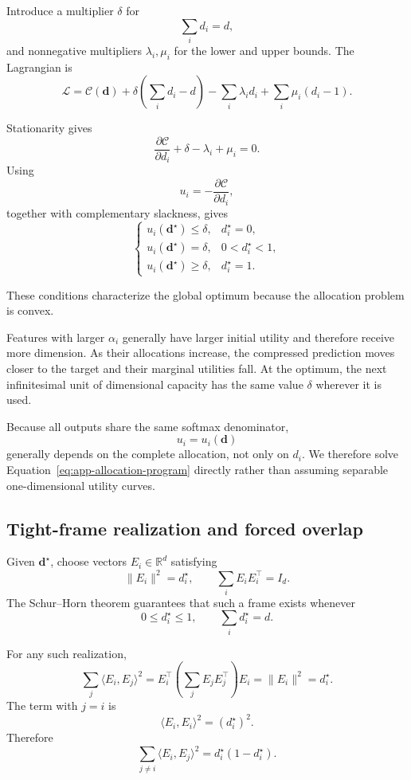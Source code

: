 Introduce a multiplier \(\delta\) for
\[
\sum_i d_i=d,
\]
and nonnegative multipliers \(\lambda_i,\mu_i\) for the lower and upper bounds. The
Lagrangian is
\[
\mathscr L
=
\mathcal C(\mathbf d)
+
\delta\left(\sum_i d_i-d\right)
-
\sum_i\lambda_i d_i
+
\sum_i\mu_i(d_i-1).
\]

Stationarity gives
\[
\frac{\partial\mathcal C}{\partial d_i}
+\delta-\lambda_i+\mu_i=0.
\]
Using
\[
u_i=-\frac{\partial\mathcal C}{\partial d_i},
\]
together with complementary slackness, gives
\begin{equation}
\boxed{
\begin{cases}
u_i(\mathbf d^\star)\le \delta,
&d_i^\star=0,
\\[1mm]
u_i(\mathbf d^\star)=\delta,
&0<d_i^\star<1,
\\[1mm]
u_i(\mathbf d^\star)\ge \delta,
&d_i^\star=1.
\end{cases}
}
\label{eq:app-water-filling}
\end{equation}

These conditions characterize the global optimum because the allocation problem is
convex.

Features with larger \(\alpha_i\) generally have larger initial utility and therefore
receive more dimension. As their allocations increase, the compressed prediction
moves closer to the target and their marginal utilities fall. At the optimum, the
next infinitesimal unit of dimensional capacity has the same value \(\delta\)
wherever it is used.

Because all outputs share the same softmax denominator,
\[
u_i=u_i(\mathbf d)
\]
generally depends on the complete allocation, not only on \(d_i\). We therefore solve
Equation~\eqref{eq:app-allocation-program} directly rather than assuming separable
one-dimensional utility curves.

\subsection{Tight-frame realization and forced overlap}

Given \(\mathbf d^\star\), choose vectors \(E_i\in\mathbb R^d\) satisfying
\begin{equation}
\|E_i\|^2=d_i^\star,
\qquad
\sum_iE_iE_i^\top=I_d.
\label{eq:app-frame-realization}
\end{equation}
The Schur--Horn theorem guarantees that such a frame exists whenever
\[
0\le d_i^\star\le1,
\qquad
\sum_i d_i^\star=d.
\]

For any such realization,
\[
\sum_j
\langle E_i,E_j\rangle^2
=
E_i^\top
\left(
\sum_jE_jE_j^\top
\right)
E_i
=
\|E_i\|^2
=
d_i^\star.
\]
The term with \(j=i\) is
\[
\langle E_i,E_i\rangle^2
=
(d_i^\star)^2.
\]
Therefore
\begin{equation}
\boxed{
\sum_{j\neq i}
\langle E_i,E_j\rangle^2
=
d_i^\star(1-d_i^\star).
}
\label{eq:app-forced-overlap}
\end{equation}

